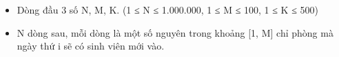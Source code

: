 \begin{itemize}
	\item     Dòng đầu 3 số N, M, K. (1 ≤ N ≤ 1.000.000, 1 ≤ M ≤ 100, 1 ≤ K ≤ 500)   
	\item     N dòng sau, mỗi dòng là một số nguyên trong khoảng [1, M] chỉ phòng mà ngày thứ i sẽ có sinh viên mới vào.   
\end{itemize}